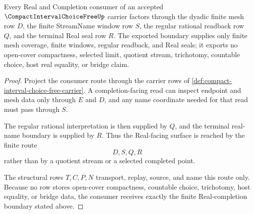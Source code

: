 \begin{theorem}\label{thm:compact-interval-choice-free-real-completion-boundary}
Every Real and Completion consumer of an accepted $\CompactIntervalChoiceFreeUp$ carrier factors through the dyadic finite mesh row $D$, the finite StreamName window row $S$, the regular rational readback row $Q$, and the terminal Real seal row $R$. The exported boundary supplies only finite mesh coverage, finite windows, regular readback, and Real seals; it exports no open-cover compactness, selected limit, quotient stream, trichotomy, countable choice, host real equality, or bridge claim.
\end{theorem}
\begin{proof}
Project the consumer route through the carrier rows of \autoref{def:compact-interval-choice-free-carrier}. A completion-facing read can inspect endpoint and mesh data only through $E$ and $D$, and any name coordinate needed for that read must pass through $S$.

The regular rational interpretation is then supplied by $Q$, and the terminal real-name boundary is supplied by $R$. Thus the Real-facing surface is reached by the finite route
$$
D,S,Q,R
$$
rather than by a quotient stream or a selected completed point.

The structural rows $T,C,P,N$ transport, replay, source, and name this route only. Because no row stores open-cover compactness, countable choice, trichotomy, host equality, or bridge data, the consumer receives exactly the finite Real-completion boundary stated above.
\end{proof}


\begin{closurestatus}{\CompactIntervalChoiceFreeUp}
  \theoryclosure{\seedClosure}
  \formalstatus{\theoremCheckedV}
\end{closurestatus}
